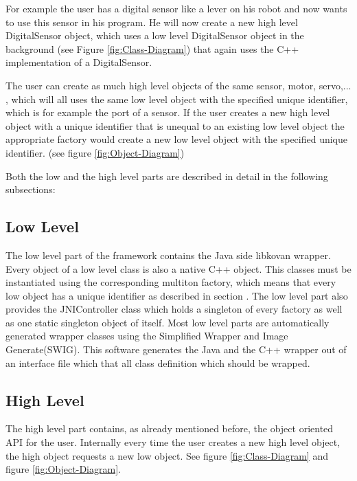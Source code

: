 \documentclass{juniorjournal}
\begin{document}
For example the user has a digital sensor like a lever on his robot and now 
wants to use this sensor in his program. He will now create a new high level 
DigitalSensor object, which uses a low level DigitalSensor object in the 
background (see Figure \ref{fig:Class-Diagram}) that again uses the C++ implementation of a DigitalSensor.

The user can create as much high level objects of the same sensor, motor, 
servo,... , which will all uses the same low level object with the specified 
unique identifier, which is for example the port of a sensor. If the user 
creates a new high level object with a unique identifier that is unequal to 
an existing low level object the appropriate factory would 
create a new low level object with the specified unique identifier. (see figure \ref{fig:Object-Diagram})

Both the low and the high level parts are described in detail in the following subsections:

\subsection{Low Level}
The low level part of the framework contains the Java\cite{Java} side libkovan\cite{libkovan} wrapper. 
Every object of a low level class is also a native C++ object.
This classes must be instantiated using the corresponding multiton factory, which means that every low object has a unique identifier as described in section .
The low level part also provides the JNIController class which holds a singleton of every factory as well as one static singleton object of itself.
Most low level parts are automatically generated wrapper classes using the Simplified Wrapper and Image Generate(SWIG).
This software generates the Java\cite{Java} and the C++ wrapper out of an interface file which that all class definition which should be wrapped.

\subsection{High Level}
The high level part contains, as already mentioned before, the object oriented API for the user. 
Internally every time the user creates a new high level object, the high object requests a new low object.
See figure \ref{fig:Class-Diagram} and figure \ref{fig:Object-Diagram}.
\end{document}
